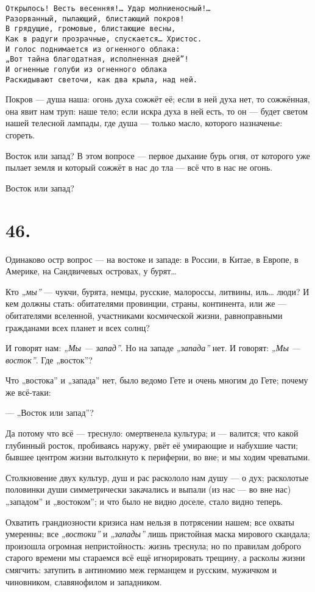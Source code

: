 \documentclass[12pt,a4paper,oneside]{book}
\begin{document}
\begin{Verbatim}
Открылось! Весть весенняя!… Удар молниеносный!…
Разорванный, пылающий, блистающий покров!
В грядущие, громовые, блистающие весны,
Как в радуги прозрачные, спускается… Христос.
И голос поднимается из огненного облака:
„Вот тайна благодатная, исполненная дней”!
И огненные голуби из огненного облака
Раскидывают светочи, как два крыла, над ней.
\end{Verbatim}

Покров — душа наша: огонь духа сожжёт её; если в ней духа нет, то сожжённая, она явит нам труп: наше тело; если искра духа в ней есть, то он — будет светом нашей телесной лампады, где душа — только масло, которого назначенье: сгореть.

Восток или запад? В этом вопросе — первое дыхание бурь огня, от которого уже пылает земля и который сожжёт в нас до тла — всё что в нас не огонь.

Восток или запад?

\section*{46.}

Одинаково остр вопрос — на востоке и западе: в России, в Китае, в Европе, в Америке, на Сандвичевых островах, у бурят…

Кто \emph{„мы”} — чукчи, бурята, немцы, русские, малороссы, литвины, иль… люди? И кем должны стать: обитателями провинции, страны, континента, или же — обитателями вселенной, участниками космической жизни, равноправными гражданами всех планет и всех солнц?

И говорят нам: \emph{„Мы — запад”}. Но на западе \emph{„запада”} нет. И говорят: \emph{„Мы — восток”}. Где „восток”?

Что „востока” и „запада” нет, было ведомо Гете и очень многим до Гете; почему же всё-таки:

— „Восток или запад”?

Да потому что всё — треснуло: омертвенела культура; и — валится; что какой глубинный росток, пробиваясь наружу, рвёт её умирающие и набухшие части; бывшее центром жизни вытолкнуто к периферии, во вне; и мы ходим чреватыми.

Столкновение двух культур, душ и рас раскололо нам душу — о дух; расколотые половинки души симметрически закачались и выпали (из нас — во вне нас) „западом” и „востоком”; и что было не видно доселе, стало видно теперь.

Охватить грандиозности кризиса нам нельзя в потрясении нашем; все охваты умеренны; все \emph{„востоки”} и \emph{„запады”} лишь пристойная маска мирового скандала; произошла огромная непристойность: жизнь треснула; но по правилам доброго старого времени мы стараемся всё ещё игнорировать трещину, а расколы жизни смягчить: затупить в антиномию меж германцем и русским, мужичком и чиновником, славянофилом и западником.
\end{document}
